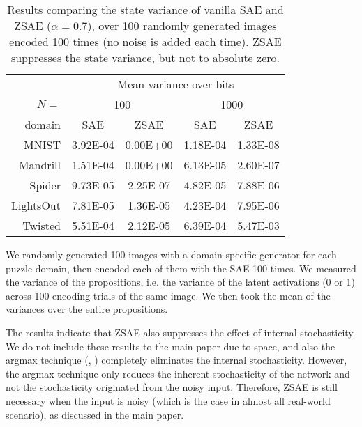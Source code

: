 \documentclass[10pt,letterpaper]{article}
\begin{document}
\begin{table}[htbp]
 \centering
 \setlength{\tabcolsep}{0.45em}
 \begin{tabular}{|r|*{4}{c|}}
       & \multicolumn{4}{c|}{Mean variance over bits} \\
$N=$ %
     & \multicolumn{2}{c|}{100}
     & \multicolumn{2}{c|}{1000} \\
domain   &SAE      &ZSAE     &SAE      &ZSAE     \\ 
MNIST    &3.92E-04 &0.00E+00 &1.18E-04 &1.33E-08 \\ 
Mandrill &1.51E-04 &0.00E+00 &6.13E-05 &2.60E-07 \\ 
Spider   &9.73E-05 &2.25E-07 &4.82E-05 &7.88E-06 \\ 
LightsOut&7.81E-05 &1.36E-05 &4.23E-04 &7.95E-06 \\ 
Twisted  &5.51E-04 &2.12E-05 &6.39E-04 &5.47E-03 \\ 
\end{tabular}
 \caption{Results comparing the state variance of vanilla SAE and ZSAE ($\alpha=0.7$),
 over 100 randomly generated images encoded 100 times (no noise is added each time).
 ZSAE suppresses the state variance, but not to absolute zero.
 }
\label{tab:variance-stochastic}
\end{table}

We randomly generated 100 images with a domain-specific generator for each puzzle domain,
then encoded each of them with the SAE 100 times.
We measured the variance of the propositions, i.e. the variance of the latent activations (0 or 1)
across 100 encoding trials of the same image.
We then took the mean of the variances over the entire propositions.

The results indicate that ZSAE also suppresses the effect of internal stochasticity.
We do not include these results to the main paper due to space,
and also the argmax technique (, )
completely eliminates the internal stochasticity.
However, the argmax technique only reduces the inherent stochasticity of the network
and not the stochasticity originated from the noisy input.
Therefore, ZSAE is still necessary when the input is noisy (which is the case in almost all real-world scenario),
as discussed in the main paper.
\end{document}
